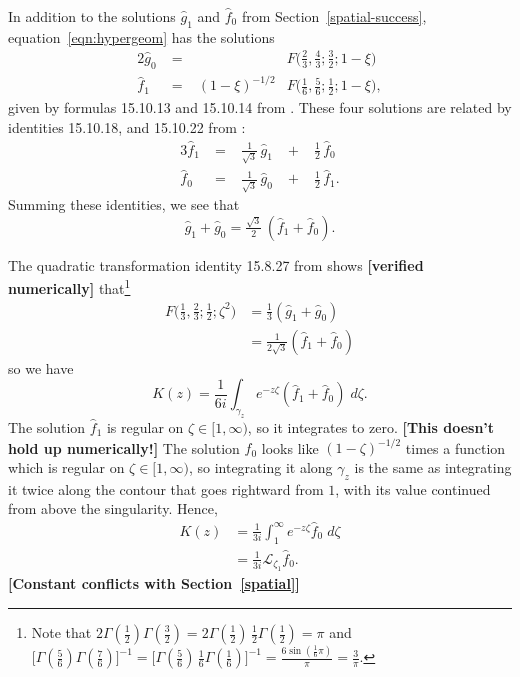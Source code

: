 \documentclass{article}
\newcommand{\laplace}{\mathcal{L}}
\begin{document}
In addition to the solutions $\hat{g}_1$ and $\hat{f}_0$ from Section~\ref{spatial-success}, equation~\ref{eqn:hypergeom} has the solutions
\begin{alignat*}{2}
\hat{g}_0 &\;=\;& & F\big(\tfrac{2}{3}, \tfrac{4}{3}; \tfrac{3}{2}; 1-\xi\big) \\
\hat{f}_1 &\;=\;& (1-\xi)^{-1/2} & F\big(\tfrac{1}{6}, \tfrac{5}{6}; \tfrac{1}{2}; 1-\xi\big),
\end{alignat*}
given by formulas 15.10.13 and 15.10.14 from \cite{dlmf}. These four solutions are related by identities 15.10.18, and 15.10.22 from \cite{dlmf}:
\begin{alignat*}{3}
\hat{f}_1 &\;=\;&\tfrac{1}{\sqrt{3}}\,\hat{g}_1 &\;+\;& \tfrac{1}{2}\,\hat{f}_0 \\
\hat{f}_0 &\;=\;& \tfrac{1}{\sqrt{3}}\,\hat{g}_0 &\;+\;& \tfrac{1}{2}\,\hat{f}_1.
\end{alignat*}
Summing these identities, we see that
\[ \hat{g}_1 + \hat{g}_0 = \tfrac{\sqrt{3}}{2}\,(\hat{f}_1 + \hat{f}_0). \]

The quadratic transformation identity 15.8.27 from \cite{dlmf} shows \textbf{[verified numerically]} that\footnote{Note that $2\Gamma(\tfrac{1}{2})\Gamma(\tfrac{3}{2}) = 2\Gamma(\tfrac{1}{2})\,\tfrac{1}{2}\Gamma(\tfrac{1}{2}) = \pi$ and $\big[\Gamma(\tfrac{5}{6})\Gamma(\tfrac{7}{6})\big]^{-1} = \big[\Gamma(\tfrac{5}{6})\,\tfrac{1}{6}\Gamma(\tfrac{1}{6})\big]^{-1} = \frac{6\sin(\tfrac{1}{6} \pi)}{\pi} = \frac{3}{\pi}$.}
\begin{align*}
F\big(\tfrac{1}{3}, \tfrac{2}{3}; \tfrac{1}{2}; \zeta^2\big) & = \tfrac{1}{3}(\hat{g}_1 + \hat{g}_0) \\
& = \tfrac{1}{2\sqrt{3}}(\hat{f}_1 + \hat{f}_0)
\end{align*}
so we have
\[ K(z) = \frac{1}{6i} \int_{\gamma_z} e^{-z\zeta} (\hat{f}_1 + \hat{f}_0)\;d\zeta. \]
The solution $\hat{f}_1$ is regular on $\zeta \in [1, \infty)$, so it integrates to zero. \textbf{[This doesn't hold up numerically!]} The solution $\hat{f}_0$ looks like $(1 - \zeta)^{-1/2}$ times a function which is regular on $\zeta \in [1, \infty)$, so integrating it along $\gamma_z$ is the same as integrating it twice along the contour that goes rightward from $1$, with its value continued from above the singularity. Hence,
\begin{align*}
K(z) & = \frac{1}{3i} \int^\infty_1 e^{-z\zeta} \hat{f}_0\;d\zeta \\
& = \tfrac{1}{3i} \laplace_{\zeta_1} \hat{f}_0.
\end{align*}
\textbf{[Constant conflicts with Section~\ref{spatial}]}
\end{document}
